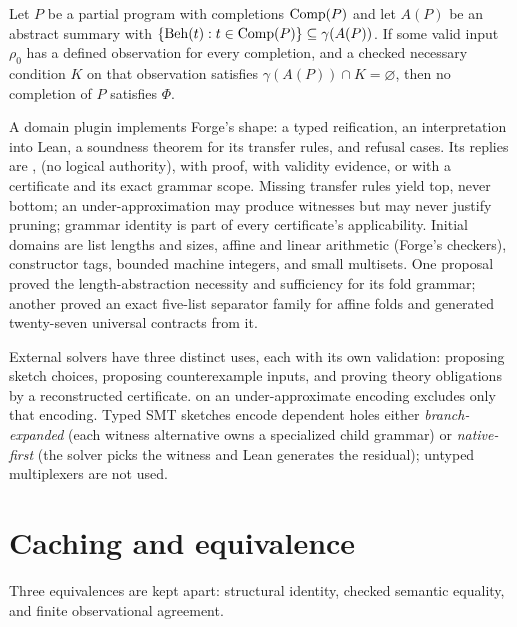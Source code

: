 \begin{proposition}\label{prop:prune}
Let $P$ be a partial program with completions $\mathrm{Comp}(P)$ and let $A(P)$ be an abstract summary with $\{\mathrm{Beh}(t) : t \in \mathrm{Comp}(P)\} \subseteq \gamma(A(P))$. If some valid input $\rho_0$ has a defined observation for every completion, and a checked necessary condition $K$ on that observation satisfies $\gamma(A(P)) \cap K = \varnothing$, then no completion of $P$ satisfies $\Phi$.
\end{proposition}

A domain plugin implements Forge's  shape: a typed reification, an interpretation into Lean, a soundness theorem for its transfer rules, and refusal cases. Its replies are ,  (no logical authority),  with proof,  with validity evidence, or  with a certificate and its exact grammar scope. Missing transfer rules yield top, never bottom; an under-approximation may produce witnesses but may never justify pruning; grammar identity is part of every certificate's applicability. Initial domains are list lengths and sizes, affine and linear arithmetic (Forge's checkers), constructor tags, bounded machine integers, and small multisets. One proposal proved the length-abstraction necessity and sufficiency for its fold grammar; another proved an exact five-list separator family for affine folds and generated twenty-seven universal contracts from it.

External solvers have three distinct uses, each with its own validation: proposing sketch choices, proposing counterexample inputs, and proving theory obligations by a reconstructed certificate.  on an under-approximate encoding excludes only that encoding. Typed SMT sketches encode dependent holes either \emph{branch-expanded} (each witness alternative owns a specialized child grammar) or \emph{native-first} (the solver picks the witness and Lean generates the residual); untyped multiplexers are not used.

\section{Caching and equivalence}\label{sec:caching}

Three equivalences are kept apart: structural identity, checked semantic equality, and finite observational agreement.

